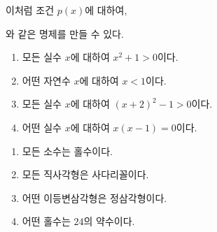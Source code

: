 \documentclass{oblivoir}
\begin{document}
\bigskip
이처럼 조건 \(p(x)\)에 대하여,%
\begin{center}
\qquad{}
\end{center}
와 같은 명제를 만들 수 있다.

%
\begin{enumerate}\label{negation12}\tightlist
\item
모든 실수 \(x\)에 대하여 \(x^2+1>0\)이다.
\item
어떤 자연수 \(x\)에 대하여 \(x<1\)이다.
\item
모든 실수 \(x\)에 대하여 \((x+2)^2-1>0\)이다.
\item
어떤 실수 \(x\)에 대하여 \(x(x-1)=0\)이다.
\end{enumerate}

\vspace{-10pt}
%
\begin{enumerate}\label{negation13}\tightlist
\item
모든 소수는 홀수이다.
\item
모든 직사각형은 사다리꼴이다.
\item
어떤 이등변삼각형은 정삼각형이다.
\item
어떤 홀수는 \(24\)의 약수이다.
\end{enumerate}
\end{document}
